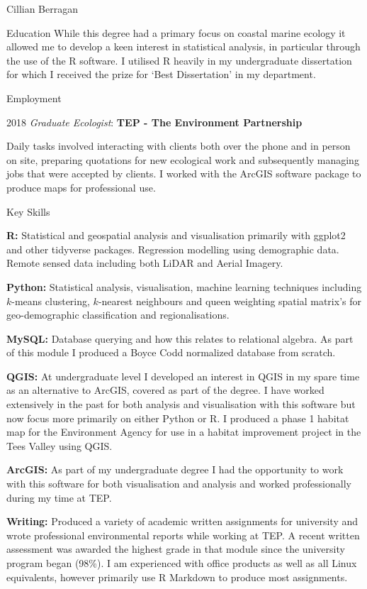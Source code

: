 \documentclass{scrartcl}
\begin{document}
\begin{cv}{Cillian Berragan}
\begin{cvlist}{Education}
    \small While this degree had a primary focus on coastal marine ecology it allowed me to develop a keen interest in statistical analysis, in particular through the use of the R software. I utilised R heavily in my undergraduate dissertation for which I received the prize for ‘Best Dissertation’ in my department.

\end{cvlist}

\begin{cvlist}{Employment}

    \item[2018] \normalsize\textit{Graduate Ecologist}: \textbf{TEP - The Environment Partnership}

    \small Daily tasks involved interacting with clients both over the phone and in person on site, preparing quotations for new ecological work and subsequently managing jobs that were accepted by clients. I worked with the ArcGIS software package to produce maps for professional use.

\end{cvlist}

\newpage
\begin{cvlist}{Key Skills}
    \small
    \item[\textbf{R:}] Statistical and geospatial analysis and visualisation primarily with ggplot2 and other tidyverse packages. Regression modelling using demographic data. Remote sensed data including both LiDAR and Aerial Imagery.
    \item[\textbf{Python:}] Statistical analysis, visualisation, machine learning techniques including $k$-means clustering, $k$-nearest neighbours and queen weighting spatial matrix's for geo-demographic classification and regionalisations.
    \item[\textbf{MySQL:}] Database querying and how this relates to relational algebra. As part of this module I produced a Boyce Codd normalized database from scratch.
    \item[\textbf{QGIS:}] At undergraduate level I developed an interest in QGIS in my spare time as an alternative to ArcGIS, covered as part of the degree. I have worked extensively in the past for both analysis and visualisation with this software but now focus more primarily on either Python or R. I produced a phase 1 habitat map for the Environment Agency for use in a habitat improvement project in the Tees Valley using QGIS.
    \item[\textbf{ArcGIS:}] As part of my undergraduate degree I had the opportunity to work with this software for both visualisation and analysis and worked professionally during my time at TEP.
    \item[\textbf{Writing:}] Produced a variety of academic written assignments for university and wrote professional environmental reports while working at TEP. A recent written assessment was awarded the highest grade in that module since the university program began (98\%). I am experienced with office products as well as all Linux equivalents, however primarily use R Markdown to produce most assignments.


\end{cvlist}
\end{cv}
\end{document}
